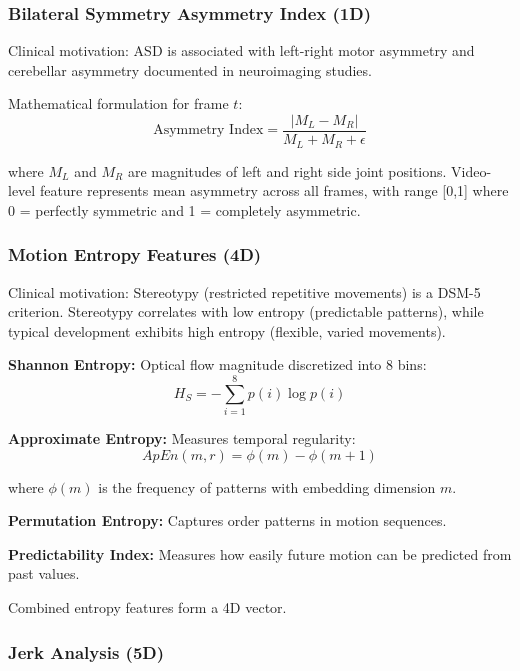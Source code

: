 \documentclass[conference]{IEEEtran}
\begin{document}
\subsubsection{Bilateral Symmetry Asymmetry Index (1D)}

Clinical motivation: ASD is associated with left-right motor asymmetry and cerebellar asymmetry documented in neuroimaging studies.

Mathematical formulation for frame $t$:
\begin{equation}
\text{Asymmetry Index} = \frac{|M_L - M_R|}{M_L + M_R + \epsilon}
\end{equation}

where $M_L$ and $M_R$ are magnitudes of left and right side joint positions. Video-level feature represents mean asymmetry across all frames, with range [0,1] where 0 = perfectly symmetric and 1 = completely asymmetric.

\subsubsection{Motion Entropy Features (4D)}

Clinical motivation: Stereotypy (restricted repetitive movements) is a DSM-5 criterion. Stereotypy correlates with low entropy (predictable patterns), while typical development exhibits high entropy (flexible, varied movements).

\textbf{Shannon Entropy:} Optical flow magnitude discretized into 8 bins:
\begin{equation}
H_S = -\sum_{i=1}^{8} p(i) \log p(i)
\end{equation}

\textbf{Approximate Entropy:} Measures temporal regularity:
\begin{equation}
ApEn(m, r) = \phi(m) - \phi(m+1)
\end{equation}

where $\phi(m)$ is the frequency of patterns with embedding dimension $m$.

\textbf{Permutation Entropy:} Captures order patterns in motion sequences.

\textbf{Predictability Index:} Measures how easily future motion can be predicted from past values.

Combined entropy features form a 4D vector.

\subsubsection{Jerk Analysis (5D)}
\end{document}
